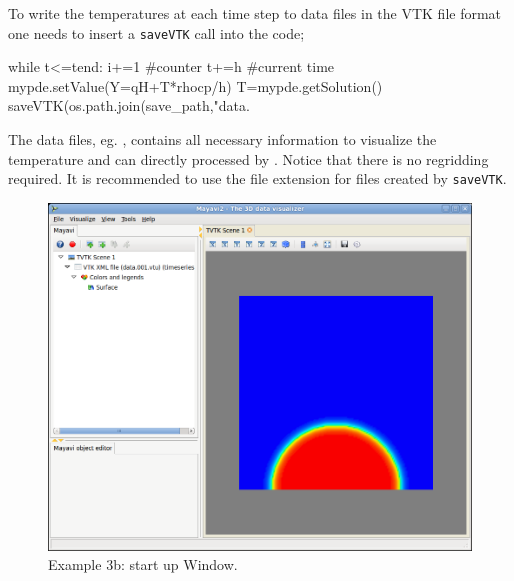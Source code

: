 To write the temperatures at each time step to data files in the VTK file format one
needs to insert a \verb|saveVTK| call into the code;
\begin{python}
while t<=tend:
      i+=1 #counter
      t+=h #current time
      mypde.setValue(Y=qH+T*rhocp/h)
      T=mypde.getSolution()
      saveVTK(os.path.join(save_path,"data.%
\end{python}
The data files, eg. , contains all necessary information to 
visualize the temperature and can directly processed by \mayavi. Notice that there is no 
regridding required. It is recommended to use the file extension  for files
created by \verb|saveVTK|. 

\begin{figure}[ht]
\centerline{\includegraphics[width=4.in]{figures/ScreeshotMayavi2n1}}
\caption{Example 3b: \mayavi start up Window.}
\label{fig:mayavi window}
\end{figure}

